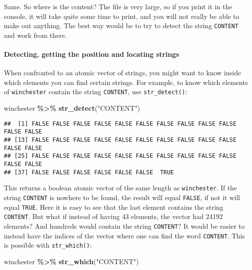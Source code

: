 \documentclass[
]{article}
\newenvironment{Shaded}{\begin{snugshade}}{\end{snugshade}}
\newcommand{\KeywordTok}[1]{\textcolor[rgb]{0.13,0.29,0.53}{\textbf{#1}}}
\newcommand{\NormalTok}[1]{#1}
\newcommand{\OperatorTok}[1]{\textcolor[rgb]{0.81,0.36,0.00}{\textbf{#1}}}
\newcommand{\StringTok}[1]{\textcolor[rgb]{0.31,0.60,0.02}{#1}}
\begin{document}
Same. So where is the content? The file is very large, so if you print it in the console, it will
take quite some time to print, and you will not really be able to make out anything. The best
way would be to try to detect the string \texttt{CONTENT} and work from there.

\hypertarget{detecting-getting-the-position-and-locating-strings}{%
\paragraph{Detecting, getting the position and locating strings}\label{detecting-getting-the-position-and-locating-strings}}

When confronted to an atomic vector of strings, you might want to know inside which elements you
can find certain strings. For example, to know which elements of \texttt{winchester} contain the string
\texttt{CONTENT}, use \texttt{str\_detect()}:

\begin{Shaded}
\begin{Highlighting}[]
\NormalTok{winchester }\OperatorTok{\%\textgreater{}\%}
\StringTok{  }\KeywordTok{str\_detect}\NormalTok{(}\StringTok{"CONTENT"}\NormalTok{)}
\end{Highlighting}
\end{Shaded}

\begin{verbatim}
##  [1] FALSE FALSE FALSE FALSE FALSE FALSE FALSE FALSE FALSE FALSE FALSE FALSE
## [13] FALSE FALSE FALSE FALSE FALSE FALSE FALSE FALSE FALSE FALSE FALSE FALSE
## [25] FALSE FALSE FALSE FALSE FALSE FALSE FALSE FALSE FALSE FALSE FALSE FALSE
## [37] FALSE FALSE FALSE FALSE FALSE FALSE  TRUE
\end{verbatim}

This returns a boolean atomic vector of the same length as \texttt{winchester}. If the string \texttt{CONTENT} is
nowhere to be found, the result will equal \texttt{FALSE}, if not it will equal \texttt{TRUE}. Here it is easy to
see that the last element contains the string \texttt{CONTENT}. But what if instead of having 43 elements,
the vector had 24192 elements? And hundreds would contain the string \texttt{CONTENT}? It would be easier
to instead have the indices of the vector where one can find the word \texttt{CONTENT}. This is possible
with \texttt{str\_which()}:

\begin{Shaded}
\begin{Highlighting}[]
\NormalTok{winchester }\OperatorTok{\%\textgreater{}\%}
\StringTok{  }\KeywordTok{str\_which}\NormalTok{(}\StringTok{"CONTENT"}\NormalTok{)}
\end{Highlighting}
\end{Shaded}
\end{document}
